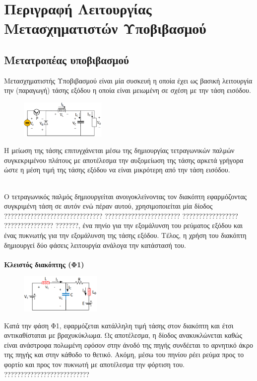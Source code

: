 \section{Περιγραφή Λειτουργίας Μετασχηματιστών Υποβιβασμού}

\subsection{Μετατροπέας υποβιβασμού}

\noindent
Μετασχηματιστής Υποβιβασμού είναι μία συσκευή η οποία έχει ως βασική λειτουργία την (παραγωγή) τάσης εξόδου η οποία είναι μειωμένη σε σχέση με την τάση εισόδου.  
\begin{figure}[h]
	\centering
	\includegraphics[width=0.37\textwidth]{Images/buckConverter.png}
\end{figure}

\noindent
Η μείωση της τάσης επιτυγχάνεται μέσω της δημιουργίας τετραγωνικών παλμών συγκεκριμένου πλάτους με αποτέλεσμα την αυξομείωση της τάσης αρκετά γρήγορα ώστε η μέση τιμή της τάσης εξόδου να είναι μικρότερη από την τάση εισόδου. 

\noindent\\
O τετραγωνικός παλμός δημιουργείται ανοιγοκλείνοντας τον διακόπτη εφαρμόζοντας συγκριμένη τάση σε αυτόν ενώ πέραν αυτού, χρησιμοποιείται μία δίοδος ?????????????????????????????? ??????????????????????? ????????????????? ??????????????? ???????, ένα πηνίο για την εξομάλυνση του ρεύματος εξόδου και ένας πυκνωτής για την εξομάλυνση της τάσης εξόδου. 
Τέλος, η χρήση του διακόπτη δημιουργεί δύο φάσεις λειτουργία ανάλογα την κατάστασή του.
\noindent\\\\
\textbf{Κλειστός διακόπτης (Φ1)}
\begin{figure}[h]
	\centering
	\includegraphics[width=0.35\textwidth]{Images/Phase_1}
\end{figure}

\noindent
Κατά την φάση Φ1, εφαρμόζεται κατάλληλη τιμή τάσης στον διακόπτη και έτσι αντικαθίσταται με βραχυκύκλωμα. Ως αποτέλεσμα, η δίοδος ανακυκλώνεται καθώς είναι ανάστροφα πολωμένη εφόσον στην άνοδό της πηγής συνδέεται το αρνητικό άκρο της πηγής και στην κάθοδο το θετικό. Ακόμη, μέσω του πηνίου ρέει ρεύμα προς το φορτίο και προς τον πυκνωτή με αποτέλεσμα την φόρτιση του.  ??????????????????????????

